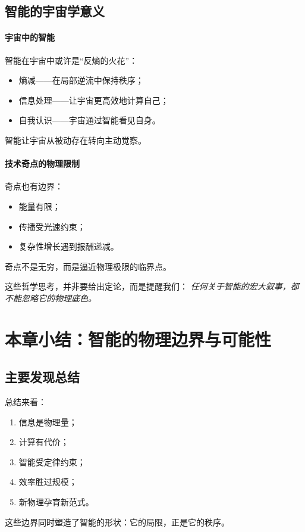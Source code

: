 \subsection{智能的宇宙学意义}

\paragraph{宇宙中的智能}
智能在宇宙中或许是“反熵的火花”：
\begin{itemize}
\item 熵减——在局部逆流中保持秩序；
\item 信息处理——让宇宙更高效地计算自己；
\item 自我认识——宇宙通过智能看见自身。
\end{itemize}
智能让宇宙从被动存在转向主动觉察。

\paragraph{技术奇点的物理限制}
奇点也有边界：
\begin{itemize}
\item 能量有限；
\item 传播受光速约束；
\item 复杂性增长遇到报酬递减。
\end{itemize}
奇点不是无穷，而是逼近物理极限的临界点。

这些哲学思考，并非要给出定论，而是提醒我们：  
\emph{任何关于智能的宏大叙事，都不能忽略它的物理底色。}

\section{本章小结：智能的物理边界与可能性}

\subsection{主要发现总结}

总结来看：
\begin{enumerate}
\item 信息是物理量；
\item 计算有代价；
\item 智能受定律约束；
\item 效率胜过规模；
\item 新物理孕育新范式。
\end{enumerate}
这些边界同时塑造了智能的形状：它的局限，正是它的秩序。


